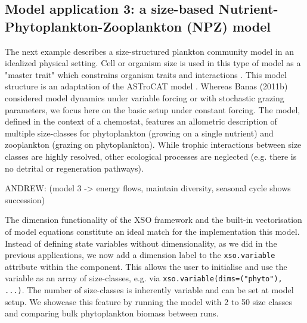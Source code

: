 \documentclass[journal abbreviation, manuscript]{copernicus}
\begin{document}
\subsection{Model application 3: a size-based Nutrient-Phytoplankton-Zooplankton (NPZ) model}

The next example describes a size-structured plankton community model in an idealized physical setting. Cell or organism size is used in this type of model as a "master trait" which constrains organism traits and interactions \citep{Litchman2008}. This model structure is an adaptation of the ASTroCAT model \citep{Banas2011b}. Whereas Banas (2011b) considered model dynamics under variable forcing or with stochastic grazing parameters, we focus here on the basic setup under constant forcing. The model, defined in the context of a chemostat, features an allometric description of multiple size-classes for phytoplankton (growing on a single nutrient) and zooplankton (grazing on phytoplankton). While trophic interactions between size classes are highly resolved, other ecological processes are neglected (e.g. there is no detrital or regeneration pathways).  

ANDREW: (model 3  -> energy flows, maintain diversity, seasonal cycle shows succession)


The dimension functionality of the XSO framework and the built-in vectorisation of model equations constitute an ideal match for the implementation this model. Instead of defining state variables without dimensionality, as we did in the previous applications, we now add a dimension label to the \texttt{xso.variable} attribute within the component. This allows the user to initialise and use the variable as an array of size-classes, e.g. via \texttt{xso.variable(dims=("phyto"), ...)}. The number of size-classes is inherently variable and can be set at model setup. We showcase this feature by running the model with 2 to 50 size classes and comparing bulk phytoplankton biomass between runs.
\end{document}
